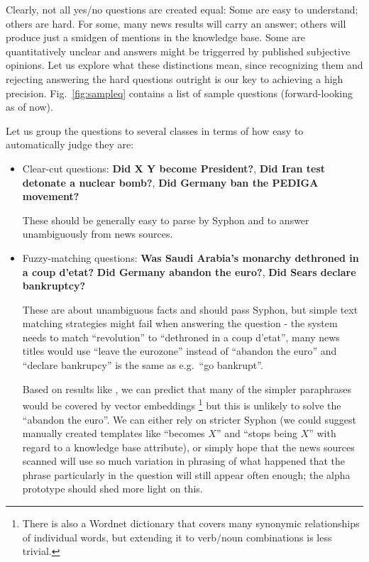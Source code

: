 \documentclass[11pt,a4paper]{article}
\begin{document}
Clearly, not all yes/no questions are created equal:
Some are easy to understand; others are hard.
For some, many news results will carry an answer; others will produce just a smidgen of mentions in the knowledge base.
Some are quantitatively unclear and answers might be triggerred by published subjective opinions.
Let us explore what these distinctions mean,
since recognizing them and rejecting answering
the hard questions outright is our key to achieving a high precision.
Fig.~\ref{fig:sampleq} contains a list of sample questions (forward-looking as of now).

Let us group the questions to several classes in terms of how easy to automatically judge they are:

\begin{itemize}
	\item Clear-cut questions: \textbf{Did X Y become President?},
		\textbf{Did Iran test detonate a nuclear bomb?},
		\textbf{Did Germany ban the PEDIGA movement?}

		These should be generally easy to parse by Syphon
		and to answer unambiguously from news sources.

	\item Fuzzy-matching questions: \textbf{Was Saudi Arabia’s monarchy dethroned in a coup d’etat?}
		\textbf{Did Germany abandon the euro?},
		\textbf{Did Sears declare bankruptcy?}

		These are about unambiguous facts and should pass Syphon,
		but simple text matching strategies might fail when
		answering the question - the system needs to match
		``revolution'' to ``dethroned in a coup d'etat'',
		many news titles would use ``leave the eurozone''
		instead of ``abandon the euro'' and ``declare bankrupcy''
		is the same as e.g.\ ``go bankrupt''.

		Based on results like \citep{DefGen,QANTA},
		we can predict that many of the simpler paraphrases
		would be covered by vector embeddings%
\footnote{There is also a Wordnet dictionary that covers many synonymic relationships of individual words, but extending it to verb/noun combinations is less trivial.}
		but this is unlikely to solve the ``abandon the euro''.
		We can either rely on stricter Syphon
		(we could suggest manually created templates like
		``becomes $X$'' and ``stops being $X$''
		with regard to a knowledge base attribute),
		or simply hope that the news sources scanned will use so
		much variation in phrasing of what happened that the phrase particularly in the question
		will still appear often enough; the alpha prototype
		should shed more light on this.


\end{itemize}
\end{document}
